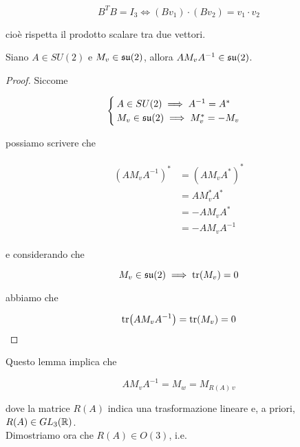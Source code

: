 \begin{equation}
	B^{T} B = I_{3} \iff (B v_{1}) \cdot (B v_{2}) = v_{1} \cdot v_{2}
\end{equation}

cioè rispetta il prodotto scalare tra due vettori.

\begin{lemma}
	Siano $ A \in SU(2) $ e $ M_{v} \in \mathfrak{su}(2) $, allora $ A M_{v} A^{-1} \in \mathfrak{su}(2) $.
\end{lemma}

\begin{proof}
	Siccome
	
	\begin{equation}
		\begin{cases}
			A \in SU(2) \implies A^{-1} = A^{*}\\
			M_{v} \in \mathfrak{su}(2) \implies M_{v}^{*} = - M_{v}
		\end{cases}
	\end{equation}

	possiamo scrivere che
	
	\begin{align}
		\begin{split}
			(A M_{v} A^{-1})^{*} &= (A M_{v} A^{*})^{*}\\
			&= A M_{v}^{*} A^{*}\\
			&= - A M_{v} A^{*}\\
			&= - A M_{v} A^{-1}
		\end{split}
	\end{align}

	e considerando che
	
	\begin{equation}
		M_{v} \in \mathfrak{su}(2) \implies \tr(M_{v}) = 0
	\end{equation}
	
	abbiamo che
	
	\begin{equation}
		\tr(A M_{v} A^{-1}) = \tr(M_{v}) = 0
	\end{equation}
\end{proof}

Questo lemma implica che

\begin{equation}
	A M_{v} A^{-1} = M_{w} = M_{R(A) \, v}
\end{equation}

dove la matrice $ R(A) $ indica una trasformazione lineare e, a priori, $ R(A) \in GL_{3}(\mathbb{R}) $.\\
Dimostriamo ora che $ R(A) \in O(3) $, i.e.

